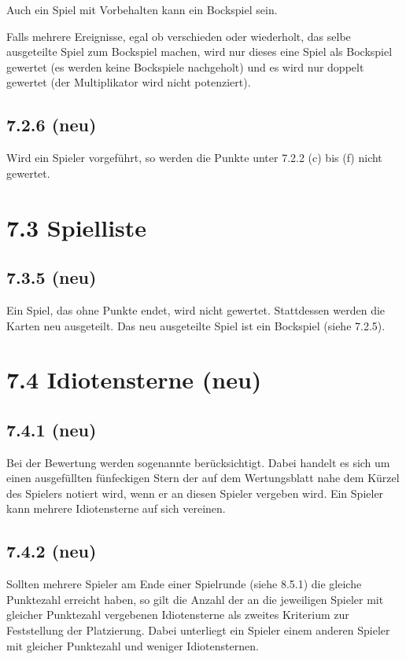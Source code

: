 Auch ein Spiel mit Vorbehalten kann ein Bockspiel sein.

Falls mehrere Ereignisse, egal ob verschieden oder wiederholt, das selbe
ausgeteilte Spiel zum Bockspiel machen, wird nur dieses eine Spiel als
Bockspiel gewertet (es werden keine Bockspiele nachgeholt) und es wird
nur doppelt gewertet (der Multiplikator wird nicht potenziert).

\subsection*{7.2.6 (neu)}

Wird ein Spieler vorgeführt, so werden die Punkte unter 7.2.2 (c) bis
(f) nicht gewertet.

\section*{7.3 Spielliste}

\subsection*{7.3.5 (neu)}

Ein Spiel, das ohne Punkte endet, wird nicht gewertet. Stattdessen
werden die Karten neu ausgeteilt. Das neu ausgeteilte Spiel ist ein
Bockspiel (siehe 7.2.5).

\section*{7.4 Idiotensterne (neu)}

\subsection*{7.4.1 (neu)}

Bei der Bewertung werden sogenannte  berücksichtigt. Dabei
handelt es sich um einen ausgefüllten fünfeckigen Stern der auf dem
Wertungsblatt nahe dem Kürzel des Spielers notiert wird, wenn er an diesen
Spieler vergeben wird. Ein Spieler kann mehrere Idiotensterne auf sich vereinen.

\subsection*{7.4.2 (neu)}

Sollten mehrere Spieler am Ende einer Spielrunde (siehe 8.5.1) die gleiche
Punktezahl erreicht haben, so gilt die Anzahl der an die jeweiligen Spieler mit
gleicher Punktezahl vergebenen Idiotensterne als zweites Kriterium zur
Feststellung der Platzierung. Dabei unterliegt ein Spieler einem anderen Spieler
mit gleicher Punktezahl und weniger Idiotensternen.

